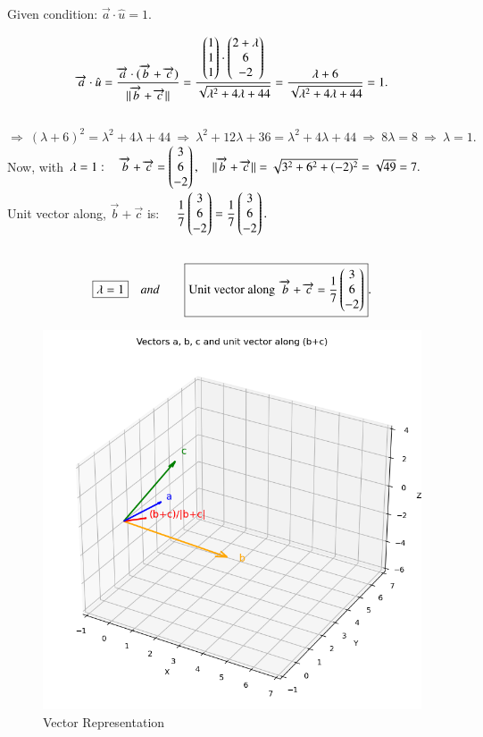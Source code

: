 \documentclass[journal]{IEEEtran}
\begin{document}
Given condition: $\overrightarrow{a}\cdot \hat{u}=1.$  

$$ \overrightarrow{a}\cdot\hat{u} = \dfrac{\overrightarrow{a}\cdot(\overrightarrow{b}+\overrightarrow{c})}{\|\overrightarrow{b}+\overrightarrow{c}\|}
= \dfrac{\begin{pmatrix}1\\1\\1\end{pmatrix}\cdot\begin{pmatrix}2+\lambda\\6\\-2\end{pmatrix}}
{\sqrt{\lambda^2+4\lambda+44}}
= \dfrac{\lambda+6}{\sqrt{\lambda^2+4\lambda+44}}=1.
$$ \\


$
\Rightarrow\ (\lambda+6)^2=\lambda^2+4\lambda+44
\ \Longrightarrow\ 
\lambda^2+12\lambda+36=\lambda^2+4\lambda+44
\ \Longrightarrow\ 
8\lambda=8\ \Longrightarrow\ 
\boxed{\lambda=1}.$ \\

Now, with $\lambda=1:\quad \overrightarrow{b}+\overrightarrow{c}
=\begin{pmatrix}3\\6\\-2\end{pmatrix},\quad \|\overrightarrow{b}+\overrightarrow{c}\|
=\sqrt{3^2+6^2+(-2)^2} = \sqrt{49} = 7.$ \\

Unit vector along, $\overrightarrow{b}+\overrightarrow{c}$ is: $\quad \dfrac{1}{7}\begin{pmatrix}3\\6\\-2\end{pmatrix}
= \dfrac{1}{7}\begin{pmatrix}3\\6\\-2\end{pmatrix}.$\\\\
\bigskip
\begin{align}   
\centering
\boxed{\lambda=1} \quad and \qquad 
\boxed{\text{Unit vector along }\,\overrightarrow{b}+\overrightarrow{c}
=\dfrac{1}{7}\myvec{3\\6\\-2}}.
\end{align}


\bigskip

\begin{figure}[htbp]
    \centering
    \includegraphics[width=0.8\linewidth]{figs/fig1.png}
    \caption{Vector Representation}
    \label{fig:fig/fig1.png}
\end{figure}
\end{document}
